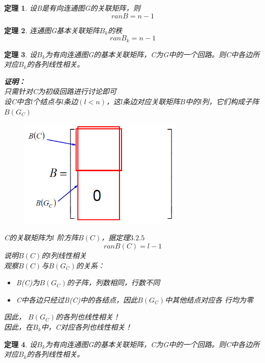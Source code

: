 \documentclass[11pt,a4paper,openany]{book}
\newcommand{\hwxw}{\CJKfamily{hwxw}}
\newcommand{\song}{\CJKfamily{song}}
\newtheorem{theorem}{\textbf{定理}}[section]
\begin{document}
\begin{theorem}
设B是有向连通图G的关联矩阵，则$$ran B=n-1$$
\end{theorem}
\begin{theorem}
连通图G基本关联矩阵$B_k$的秩$$ran B_k=n-1$$
\end{theorem}
\begin{theorem}
设$B_k$为有向连通图G的基本关联矩阵，C为G中的一个回路。则C中各边所对应$B_k$的各列线性相关。\\
{\song
\textbf{证明：}\\
只需针对C为初级回路进行讨论即可\\
设C中含$l$个结点与$l$条边$(l<n)$，这$l$条边对应关联矩阵$B$中的$l$列，它们构成子阵$B(G_C)$  \\
\begin{figure}[H]
  \centering
  \includegraphics[width=0.7\textwidth]{3.4.png}\\
  \caption{}
\end{figure}
\noindent C的关联矩阵为$l$ 阶方阵$B(C)$，据定理$3.2.5$ $$ran B(C)=l-1$$
说明$B(C)$的$l$列线性相关\\
观察$B(C)$与$B(G_C)$的关系：
{\hwxw
\begin{itemize}
  \item B(C)为$B(G_C)$的子阵，列数相同，行数不同
  \item C中各边只经过B(C)中的各结点，因此$B(G_C)$中其他结点对应各
行均为零
\end{itemize}
}
因此， $B(G_C)$的各列也线性相关！\\
因此，在$B_k$中，C对应各列也线性相关！\\
}
\end{theorem}
\begin{theorem}
设$B_k$为有向连通图G的基本关联矩阵，C为G中的一个回路。则C中各边所对应$B_k$的各列线性相关。\\
\end{theorem}
\end{document}
